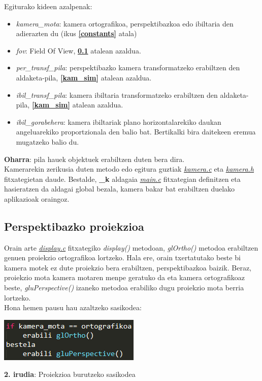 \documentclass[12pt]{article}
\newcommand{\fitxategi}[1] {\underline{\textit{#1}}}
\newcommand{\metodo}[1] {\textit{#1}}
\newcommand{\aldagai}[1] {\textit{#1}}
\newcommand{\erref}[1] {\textbf{\ref{#1}}}
\begin{document}
Egiturako kideen azalpenak:

\begin{itemize}
\item \aldagai{kamera\_mota}: kamera ortografikoa, perspektibazkoa edo ibiltaria den adierazten du (ikus \erref{constants} atala)
\item \aldagai{fov}: Field Of View\cite{fov}, \erref{per_proj} atalean azaldua.
\item \aldagai{per\_transf\_pila}: perspektibazko kamera transformatzeko erabiltzen den aldaketa-pila, \erref{kam_sim} atalean azaldua.
\item \aldagai{ibil\_transf\_pila}: kamera ibiltaria transformatzeko erabiltzen den aldaketa-pila, \erref{kam_sim} atalean azaldua.
\item \aldagai{ibil\_gorabehera}: kamera ibiltariak plano horizontalarekiko daukan angeluarekiko proportzionala den balio bat. Bertikalki bira daitekeen eremua mugatzeko balio du.
\end{itemize}

\textbf{Oharra}: pila hauek objektuek erabiltzen duten bera dira.\\

Kamerarekin zerikusia duten metodo edo egitura guztiak \fitxategi{kamera.c} eta \fitxategi{kamera.h} fitxategietan daude.
Bestalde, \textbf{\_k} aldagaia \fitxategi{main.c} fitxategian definitzen eta hasieratzen da aldagai global bezala, kamera bakar bat erabiltzen duelako aplikazioak oraingoz.


\subsection{Perspektibazko proiekzioa}\label{per_proj}
Orain arte \fitxategi{display.c} fitxategiko \metodo{display()} metodoan, \metodo{glOrtho()} metodoa erabiltzen genuen proiekzio ortografikoa lortzeko. Hala ere, orain txertatutako beste bi kamera motek ez dute proiekzio bera erabiltzen, perspektibazkoa baizik. Beraz, proiekzio mota kamera motaren menpe geratuko da eta kamera ortografikoaz beste, \metodo{gluPerspective()}\cite{glu_perspective} izaneko metodoa erabiliko dugu proiekzio mota berria lortzeko.\\
Hona hemen pausu hau azaltzeko sasikodea:

\begin{center}
\includegraphics[scale=1]{kamera_projection.png}

\textbf{2. irudia}: Proiekzioa burutzeko sasikodea
\end{center}
\end{document}
